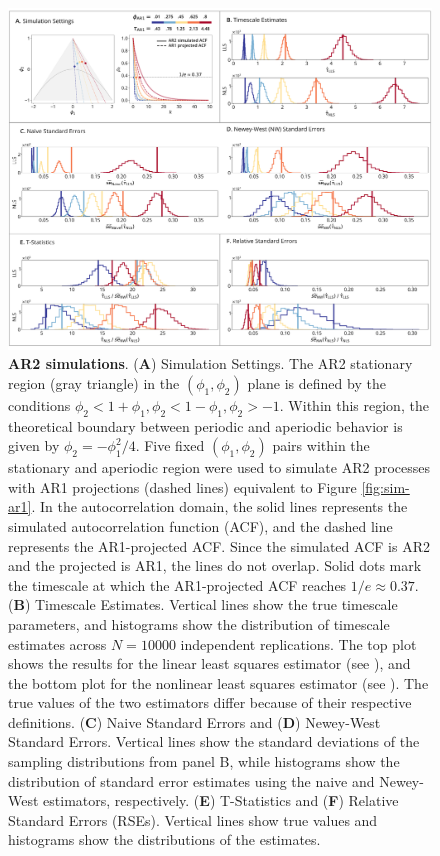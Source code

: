 \documentclass[latex/main.tex]{subfiles}
\begin{document}
\begin{figure}[H]
    \centering
    \includegraphics[width=1\textwidth]{latex/results/fig02-ar2.png} 
    \caption{
    \textbf{AR2 simulations}.
    (\textbf{A}) Simulation Settings. The AR2 stationary region (gray triangle) in the $(\phi_1, \phi_2)$ plane is defined by the conditions $\phi_2<1+\phi_1, \phi_2<1-\phi_1, \phi_2>-1$. Within this region, the theoretical boundary between periodic and aperiodic behavior is given by $\phi_2 = -\phi_1^2/4$. Five fixed $(\phi_1, \phi_2)$ pairs within the stationary and aperiodic region were used to simulate AR2 processes with AR1 projections (dashed lines) equivalent to Figure \ref{fig:sim-ar1}. In the autocorrelation domain, the solid lines represents the simulated autocorrelation function (ACF), and the dashed line represents the AR1-projected ACF. Since the simulated ACF is AR2 and the projected is AR1, the lines do not overlap. Solid dots mark the timescale at which the AR1-projected ACF reaches $1/e \approx 0.37$.
    (\textbf{B}) Timescale Estimates. Vertical lines show the true timescale parameters, and histograms show the distribution of timescale estimates across $N=10000$ independent replications. The top plot shows the results for the linear least squares estimator (see ), and the bottom plot for the nonlinear least squares estimator (see ). The true values of the two estimators differ because of their respective definitions.
    (\textbf{C}) Naive Standard Errors and (\textbf{D}) Newey-West Standard Errors. Vertical lines show the standard deviations of the sampling distributions from panel B, while histograms show the distribution of standard error estimates using the naive and Newey-West estimators, respectively.
    (\textbf{E}) T-Statistics and (\textbf{F}) Relative Standard Errors (RSEs). Vertical lines show true values and histograms show the distributions of the estimates.
    }
    \label{fig:sim-ar2}
\end{figure}
\end{document}
